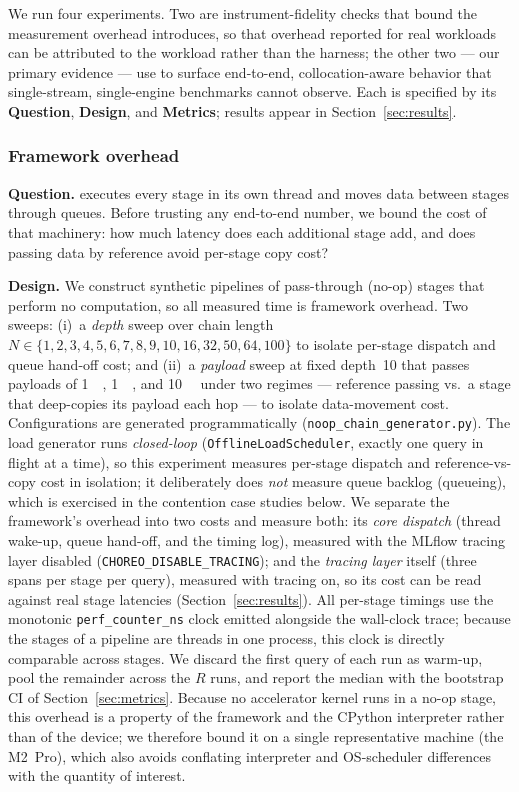 We run four experiments. Two are instrument-fidelity checks that bound the
measurement overhead \sysname{} introduces, so that overhead reported for real
workloads can be attributed to the workload rather than the harness; the other
two --- our primary evidence --- use \sysname{} to surface end-to-end,
collocation-aware behavior that single-stream, single-engine benchmarks cannot
observe. Each is specified by its \textbf{Question}, \textbf{Design}, and
\textbf{Metrics}; results appear in Section~\ref{sec:results}.

\subsubsection{Framework overhead}
\label{sec:exp-noop}

\textbf{Question.} \sysname{} executes every stage in its own thread and moves
data between stages through queues. Before trusting any end-to-end number, we
bound the cost of that machinery: how much latency does each additional stage
add, and does passing data by reference avoid per-stage copy cost?

\textbf{Design.} We construct synthetic pipelines of pass-through (no-op)
stages that perform no computation, so all measured time is framework overhead.
Two sweeps: (i)~a \emph{depth} sweep over chain length
$N \in \{1,2,3,4,5,6,7,8,9,10,16,32,50,64,100\}$ to isolate per-stage dispatch
and queue hand-off cost; and (ii)~a \emph{payload} sweep at fixed depth~10 that
passes payloads of \SI{1}{\kibi\byte}, \SI{1}{\mebi\byte}, and
\SI{10}{\mebi\byte} under two regimes --- reference passing vs.\ a stage that
deep-copies its payload each hop --- to isolate data-movement cost.
Configurations are generated programmatically
(\texttt{noop\_chain\_generator.py}). The load generator runs \emph{closed-loop}
(\texttt{OfflineLoadScheduler}, exactly one query in flight at a time), so this
experiment measures per-stage dispatch and reference-vs-copy cost in isolation;
it deliberately does \emph{not} measure queue backlog (queueing), which is
exercised in the contention case studies below. We separate the framework's
overhead into two costs and measure both: its \emph{core dispatch} (thread
wake-up, queue hand-off, and the timing log), measured with the MLflow tracing
layer disabled (\texttt{CHOREO\_DISABLE\_TRACING}); and the \emph{tracing layer}
itself (three spans per stage per query), measured with tracing on, so its cost
can be read against real stage latencies (Section~\ref{sec:results}). All
per-stage timings use the monotonic \texttt{perf\_counter\_ns} clock emitted
alongside the wall-clock trace; because the stages of a pipeline are threads in
one process, this clock is directly comparable across stages. We discard the
first query of each run as warm-up, pool the remainder across the $R$ runs, and
report the median with the bootstrap CI of Section~\ref{sec:metrics}. Because
no accelerator kernel runs in a no-op stage, this overhead is a property of the
framework and the CPython interpreter rather than of the device; we therefore
bound it on a single representative machine (the M2~Pro), which also avoids
conflating interpreter and OS-scheduler differences with the quantity of
interest.

